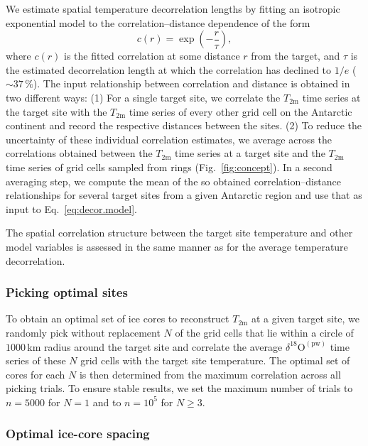 \documentclass[cp, manuscript]{copernicus}
\begin{document}
We estimate spatial temperature decorrelation lengths by fitting an isotropic
exponential model to the correlation--distance dependence of the form
\begin{equation}\label{eq:decor.model}
c(r) = \exp{\left(-\frac{r}{\tau}\right)},
\end{equation}
where $c(r)$ is the fitted correlation at some distance $r$ from the target, and
$\tau$ is the estimated decorrelation length at which the correlation has
declined to $1/e$ ($\sim37\,\%$). The input relationship between correlation and
distance is obtained in two different ways: (1) For a single target site, we
correlate the $T_{2\mathrm{m}}$ time series at the target site with the
$T_{2\mathrm{m}}$ time series of every other grid cell on the Antarctic
continent and record the respective distances between the sites. (2) To reduce
the uncertainty of these individual correlation estimates, we average across the
correlations obtained between the $T_{2\mathrm{m}}$ time series at a target site
and the $T_{2\mathrm{m}}$ time series of grid cells sampled from rings
(Fig.~\ref{fig:concept}). In a second averaging step, we compute the mean of the
so obtained correlation--distance relationships for several target sites from a
given Antarctic region and use that as input to Eq.~\eqref{eq:decor.model}.

The spatial correlation structure between the target site temperature and other
model variables is assessed in the same manner as for the average temperature
decorrelation.

\subsubsection{Picking optimal sites}\label{methods:picking}

To obtain an optimal set of ice cores to reconstruct $T_{2\mathrm{m}}$ at a
given target site, we randomly pick without replacement $N$ of the
grid cells that lie within a circle of $1000$\,km radius around the target site
and correlate the average $\delta^{18}\mathrm{O}^{\mathrm{(pw)}}$ time series of
these $N$ grid cells with the target site temperature. The optimal set of cores
for each $N$ is then determined from the maximum correlation across all picking
trials. To ensure stable results, we set the maximum number of trials to
$n=5000$ for $N=1$ and to $n=10^5$ for $N\geq3$.

\subsubsection{Optimal ice-core spacing}\label{methods:general}
\end{document}
